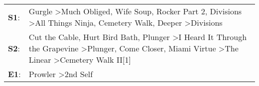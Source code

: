\begin{supertabular}{p{0.03\textwidth}p{0.92\textwidth}}
 \textbf{S1}:  &                                              Gurgle\textsuperscript{} \textgreater \enspace Much Obliged\textsuperscript{}, \enspace Wife Soup\textsuperscript{}, \enspace Rocker Part 2\textsuperscript{}, \enspace Divisions\textsuperscript{} \textgreater \enspace All Things Ninja\textsuperscript{}, \enspace Cemetery Walk\textsuperscript{}, \enspace Deeper\textsuperscript{} \textgreater \enspace Divisions\textsuperscript{}  \enspace  \\
 \textbf{S2}:  &  Cut the Cable\textsuperscript{}, \enspace Hurt Bird Bath\textsuperscript{}, \enspace Plunger\textsuperscript{} \textgreater \enspace I Heard It Through the Grapevine\textsuperscript{} \textgreater \enspace Plunger\textsuperscript{}, \enspace Come Closer\textsuperscript{}, \enspace Miami Virtue\textsuperscript{} \textgreater \enspace The Linear\textsuperscript{} \textgreater \enspace Cemetery Walk II[1]\textsuperscript{}  \enspace  \\
 \textbf{E1}:  &                                                                                                                                                                                                                                                                                                                                                               Prowler\textsuperscript{} \textgreater \enspace 2nd Self\textsuperscript{}  \enspace  \\
\end{supertabular}
